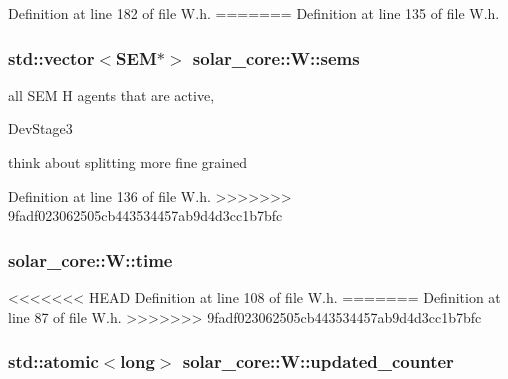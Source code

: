Definition at line 182 of file W.\+h.
=======
Definition at line 135 of file W.\+h.

\hypertarget{classsolar__core_1_1_w_ab6349cbc751747a05618dad4ebb1b726}{}
\subsubsection[{sems}]{\setlength{\rightskip}{0pt plus 5cm}std\+::vector$<$S\+E\+M$\ast$$>$ solar\+\_\+core\+::\+W\+::sems\hspace{0.3cm}{\ttfamily [protected]}}\label{classsolar__core_1_1_w_ab6349cbc751747a05618dad4ebb1b726}
all S\+E\+M H agents that are active,\begin{DoxyRefDesc}{Dev\+Stage3}
\item[\hyperlink{_dev_stage3__DevStage3000006}{Dev\+Stage3}]think about splitting more fine grained \end{DoxyRefDesc}


Definition at line 136 of file W.\+h.
>>>>>>> 9fadf023062505cb443534457ab9d4d3cc1b7bfc

\hypertarget{classsolar__core_1_1_w_ae96b30122adc9fae8fc2f209a4c89b0a}{}
\subsubsection[{time}]{ solar\+\_\+core\+::\+W\+::time}\label{classsolar__core_1_1_w_ae96b30122adc9fae8fc2f209a4c89b0a}


<<<<<<< HEAD
Definition at line 108 of file W.\+h.
=======
Definition at line 87 of file W.\+h.
>>>>>>> 9fadf023062505cb443534457ab9d4d3cc1b7bfc

\hypertarget{classsolar__core_1_1_w_a775d817c6117b462571c3fca62fe0c86}{}
\subsubsection[{updated\+\_\+counter}]{\setlength{\rightskip}{0pt plus 5cm}std\+::atomic$<$long$>$ solar\+\_\+core\+::\+W\+::updated\+\_\+counter}\label{classsolar__core_1_1_w_a775d817c6117b462571c3fca62fe0c86}


